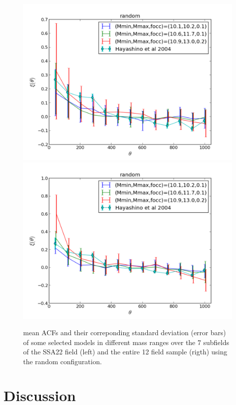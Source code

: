 \documentclass[usenatbib]{mn2e}
\begin{document}
\begin{figure}
\begin{center}
\includegraphics[width=0.46\linewidth,angle=0]{./plots/random_large_correlation_selected_models.pdf}
\hspace{5mm}
\includegraphics[width=0.46\linewidth,angle=0]{./plots/random_full_correlation_selected_models.pdf}
\end{center} 
\caption{ mean ACFs   and their correponding standard deviation (error
  bars)  of some selected models in different mass ranges over the 7
  subfields of the SSA22 field (left) and the entire 12 field sample
  (rigth) using the  random
  configuration. \label{figure:correlation_random} }  
  
\end{figure}

\section{Discussion}
\end{document}
